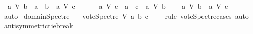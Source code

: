 \begin{isabellebody}
\ \ {\isasymnot}{\isacharparenleft}{\kern0pt}{\isacharparenleft}{\kern0pt}{\isacharparenleft}{\kern0pt}a\ {\isasymrightarrow}\isactrlsup {\isacharplus}{\kern0pt}\isactrlbsub V\isactrlesub \ b{\isacharparenright}{\kern0pt}\ {\isasymor}\ a\ {\isacharequal}{\kern0pt}\ b{\isacharparenright}{\kern0pt}\ {\isasymand}\ {\isasymnot}{\isacharparenleft}{\kern0pt}a\ {\isasymrightarrow}\isactrlsup {\isacharplus}{\kern0pt}\isactrlbsub V\isactrlesub \ c{\isacharparenright}{\kern0pt}{\isacharparenright}{\kern0pt}\ {\isasymand}\ \ \isanewline
\ \ \ {\isasymnot}{\isacharparenleft}{\kern0pt}{\isacharparenleft}{\kern0pt}{\isacharparenleft}{\kern0pt}a\ {\isasymrightarrow}\isactrlsup {\isacharplus}{\kern0pt}\isactrlbsub V\isactrlesub \ c{\isacharparenright}{\kern0pt}\ {\isasymor}\ a\ {\isacharequal}{\kern0pt}\ c{\isacharparenright}{\kern0pt}\ {\isasymand}\ {\isasymnot}{\isacharparenleft}{\kern0pt}a\ {\isasymrightarrow}\isactrlsup {\isacharplus}{\kern0pt}\isactrlbsub V\isactrlesub \ b{\isacharparenright}{\kern0pt}{\isacharparenright}{\kern0pt}{\isasymand}\ \ \isanewline
\ \ {\isasymnot}{\isacharparenleft}{\kern0pt}{\isacharparenleft}{\kern0pt}a\ {\isasymrightarrow}\isactrlsup {\isacharplus}{\kern0pt}\isactrlbsub V\isactrlesub \ b{\isacharparenright}{\kern0pt}\ {\isasymand}\ {\isacharparenleft}{\kern0pt}a\ {\isasymrightarrow}\isactrlsup {\isacharplus}{\kern0pt}\isactrlbsub V\isactrlesub \ c{\isacharparenright}{\kern0pt}{\isacharparenright}{\kern0pt}{\isachardoublequoteclose}\isanewline
%
\isadelimproof
\ \ %
\endisadelimproof
%
\isatagproof
{}\isamarkupfalse%
\ auto%
\endisatagproof
{\isafoldproof}%
%
\isadelimproof
\isanewline
%
\endisadelimproof
\isanewline
\isanewline
{}\isamarkupfalse%
\ domain{\isacharunderscore}{\kern0pt}Spectre{\isacharcolon}{\kern0pt}\isanewline
\ \ \ {\isachardoublequoteopen}vote{\isacharunderscore}{\kern0pt}Spectre\ V\ a\ b\ c\ {\isasymin}\ {\isacharbraceleft}{\kern0pt}{\isacharminus}{\kern0pt}{}{\isacharcomma}{\kern0pt}\ {}{\isacharcomma}{\kern0pt}\ {}{\isacharbraceright}{\kern0pt}{\isachardoublequoteclose}\isanewline
%
\isadelimproof
%
\endisadelimproof
%
\isatagproof
{}\isamarkupfalse%
{\isacharparenleft}{\kern0pt}rule\ vote{\isacharunderscore}{\kern0pt}Spectre{\isachardot}{\kern0pt}cases{\isacharcomma}{\kern0pt}\ auto{\isacharparenright}{\kern0pt}\ \isamarkupfalse%
%
\endisatagproof
{\isafoldproof}%
%
\isadelimproof
\isanewline
%
\endisadelimproof
\isanewline
\isanewline
\isanewline
{}\isamarkupfalse%
\ antisymmetric{\isacharunderscore}{\kern0pt}tie{\isacharunderscore}{\kern0pt}break{\isacharcolon}{\kern0pt}\isanewline

\end{isabellebody}
